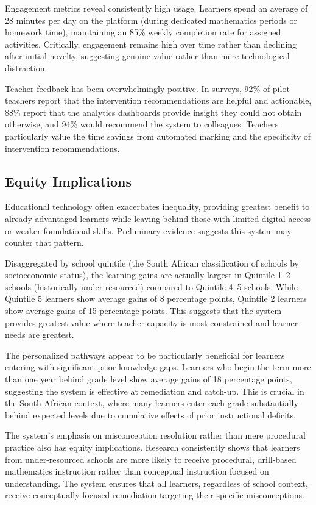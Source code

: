 \documentclass[12pt,a4paper]{article}
\begin{document}
Engagement metrics reveal consistently high usage. Learners spend an average of 28 minutes per day on the platform (during dedicated mathematics periods or homework time), maintaining an 85\% weekly completion rate for assigned activities. Critically, engagement remains high over time rather than declining after initial novelty, suggesting genuine value rather than mere technological distraction.

Teacher feedback has been overwhelmingly positive. In surveys, 92\% of pilot teachers report that the intervention recommendations are helpful and actionable, 88\% report that the analytics dashboards provide insight they could not obtain otherwise, and 94\% would recommend the system to colleagues. Teachers particularly value the time savings from automated marking and the specificity of intervention recommendations.

\subsection{Equity Implications}

Educational technology often exacerbates inequality, providing greatest benefit to already-advantaged learners while leaving behind those with limited digital access or weaker foundational skills. Preliminary evidence suggests this system may counter that pattern.

Disaggregated by school quintile (the South African classification of schools by socioeconomic status), the learning gains are actually largest in Quintile 1--2 schools (historically under-resourced) compared to Quintile 4--5 schools. While Quintile 5 learners show average gains of 8 percentage points, Quintile 2 learners show average gains of 15 percentage points. This suggests that the system provides greatest value where teacher capacity is most constrained and learner needs are greatest.

The personalized pathways appear to be particularly beneficial for learners entering with significant prior knowledge gaps. Learners who begin the term more than one year behind grade level show average gains of 18 percentage points, suggesting the system is effective at remediation and catch-up. This is crucial in the South African context, where many learners enter each grade substantially behind expected levels due to cumulative effects of prior instructional deficits.

The system's emphasis on misconception resolution rather than mere procedural practice also has equity implications. Research consistently shows that learners from under-resourced schools are more likely to receive procedural, drill-based mathematics instruction rather than conceptual instruction focused on understanding. The system ensures that all learners, regardless of school context, receive conceptually-focused remediation targeting their specific misconceptions.
\end{document}
